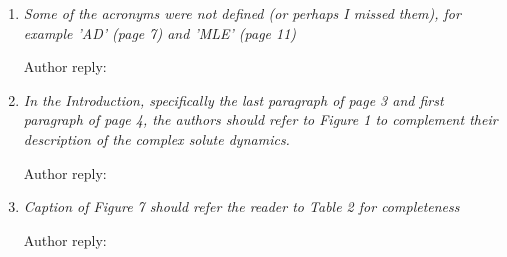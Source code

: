 \documentclass{article}
\begin{document}
\begin{enumerate}[label={Comment \theenumi :}, leftmargin=3.9\parindent]
    \item \textit{Some of the acronyms were not defined (or perhaps I missed them), for example 'AD' 
    (page 7) and 'MLE' (page 11)}
    
    Author reply:

    \item \textit{In the Introduction, specifically the last paragraph of page 3 and first paragraph
    of page 4, the authors should refer to Figure 1 to complement their description of the complex solute
    dynamics.}
    
    Author reply:

    \item \textit{Caption of Figure 7 should refer the reader to Table 2 for completeness}
    
    Author reply:

\end{enumerate}

%
%
\end{document}
